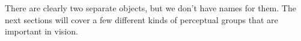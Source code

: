 There are clearly two separate objects, but we don't have names for them.
%
%
%
The next sections will cover a few different kinds of perceptual groups that are important in vision.

